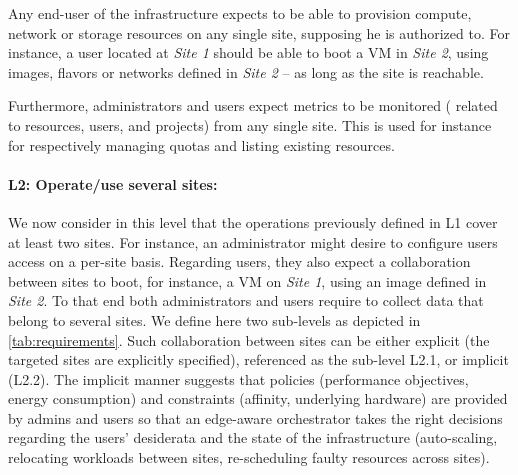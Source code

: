 Any end-user of the infrastructure expects to be able to provision compute,
network or storage resources on any single site, supposing he is authorized to.
For instance, a user located at \emph{Site 1} should be able to boot a VM in
\emph{Site 2}, using images, flavors or networks defined in \emph{Site 2} -- as
long as the site is reachable.

Furthermore, administrators and users expect metrics to be monitored (\eg
related to resources, users, and projects) from any single site. This is used
for instance for respectively managing quotas and listing existing resources.

\paragraph{L2: Operate/use several sites:}
We now consider in this level that the operations previously defined in L1
cover at least two sites. For instance, an administrator might desire to
configure users access on a per-site basis. Regarding users, they also expect
a collaboration between sites to boot, for instance, a VM on \emph{Site 1},
using an image defined in \emph{Site 2}. To that end both administrators and
users require to collect data that belong to several sites. We define here two
sub-levels as depicted in \cref{tab:requirements}. Such collaboration between
sites can be either explicit (\ie the targeted sites are explicitly specified),
referenced as the sub-level L2.1, or implicit (L2.2). The implicit manner
suggests that policies (\eg performance objectives, energy consumption) and
constraints (\eg affinity, underlying hardware) are provided by admins and users so
that an edge-aware orchestrator takes the right decisions regarding the users'
desiderata and the state of the infrastructure (\eg auto-scaling, relocating
workloads between sites, re-scheduling faulty resources across sites).

